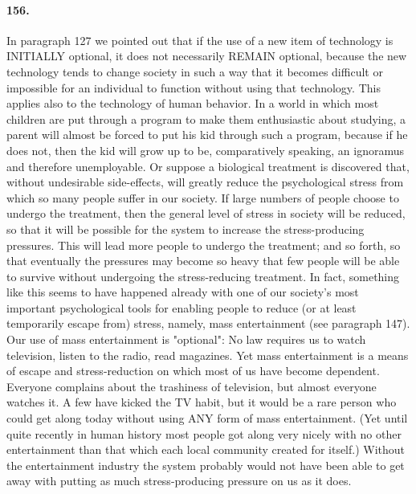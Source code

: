 \documentclass[12pt]{book}
\begin{document}
\paragraph{156.} In paragraph 127 we pointed out that if the use of a new item of technology is INITIALLY optional, it does not necessarily REMAIN optional, because the new technology tends to change society in such a way that it becomes difficult or impossible for an individual to function without using that technology. This applies also to the technology of human behavior. In a world in which most children are put through a program to make them enthusiastic about studying, a parent will almost be forced to put his kid through such a program, because if he does not, then the kid will grow up to be, comparatively speaking, an ignoramus and therefore unemployable. Or suppose a biological treatment is discovered that, without undesirable side-effects, will greatly reduce the psychological stress from which so many people suffer in our society. If large numbers of people choose to undergo the treatment, then the general level of stress in society will be reduced, so that it will be possible for the system to increase the stress-producing pressures. This will lead more people to undergo the treatment; and so forth, so that eventually the pressures may become so heavy that few people will be able to survive without undergoing the stress-reducing treatment. In fact, something like this seems to have happened already with one of our society's most important psychological tools for enabling people to reduce (or at least temporarily escape from) stress, namely, mass entertainment (see paragraph 147). Our use of mass entertainment is "optional": No law requires us to watch television, listen to the radio, read magazines. Yet mass entertainment is a means of escape and stress-reduction on which most of us have become dependent. Everyone complains about the trashiness of television, but almost everyone watches it. A few have kicked the TV habit, but it would be a rare person who could get along today without using ANY form of mass entertainment. (Yet until quite recently in human history most people got along very nicely with no other entertainment than that which each local community created for itself.) Without the entertainment industry the system probably would not have been able to get away with putting as much stress-producing pressure on us as it does.
\end{document}
